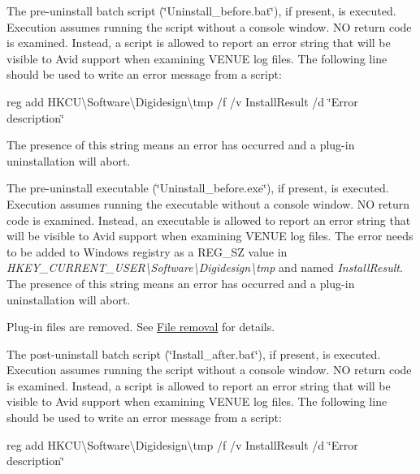 \begin{DoxyEnumerate}
\item The pre-\/uninstall batch script (\char`\"{}\+Uninstall\+\_\+before.\+bat\char`\"{}), if present, is executed. Execution assumes running the script without a console window. N\+O return code is examined. Instead, a script is allowed to report an error string that will be visible to Avid support when examining V\+E\+N\+U\+E log files. The following line should be used to write an error message from a script\+:

{\ttfamily reg add H\+K\+C\+U\textbackslash{}Software\textbackslash{}Digidesign\textbackslash{}tmp /f /v Install\+Result /d \char`\"{}\+Error description\char`\"{}}

The presence of this string means an error has occurred and a plug-\/in uninstallation will abort.  
\item The pre-\/uninstall executable (\char`\"{}\+Uninstall\+\_\+before.\+exe\char`\"{}), if present, is executed. Execution assumes running the executable without a console window. N\+O return code is examined. Instead, an executable is allowed to report an error string that will be visible to Avid support when examining V\+E\+N\+U\+E log files. The error needs to be added to Windows registry as a {\ttfamily R\+E\+G\+\_\+\+S\+Z} value in {\itshape H\+K\+E\+Y\+\_\+\+C\+U\+R\+R\+E\+N\+T\+\_\+\+U\+S\+E\+R\textbackslash{}Software\textbackslash{}Digidesign\textbackslash{}tmp} and named {\itshape Install\+Result}. The presence of this string means an error has occurred and a plug-\/in uninstallation will abort.  
\item Plug-\/in files are removed. See \hyperlink{a00377_subsubsection__aax_venue_guide__system_details__plugin_installation__removal}{File removal} for details.  
\item The post-\/uninstall batch script (\char`\"{}\+Install\+\_\+after.\+bat\char`\"{}), if present, is executed. Execution assumes running the script without a console window. N\+O return code is examined. Instead, a script is allowed to report an error string that will be visible to Avid support when examining V\+E\+N\+U\+E log files. The following line should be used to write an error message from a script\+:

{\ttfamily reg add H\+K\+C\+U\textbackslash{}Software\textbackslash{}Digidesign\textbackslash{}tmp /f /v Install\+Result /d \char`\"{}\+Error description\char`\"{}}


\end{DoxyEnumerate}
